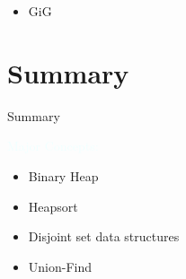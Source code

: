\documentclass{beamer}
\newcommand{\tblue}[1]{{\Large {\textcolor{azure}{#1}}}}
\begin{document}
\begin{frame}{}
    \begin{itemize}
        \item GiG
    \end{itemize}
\end{frame}

\section{Summary}

\begin{frame}{Summary}

\tblue{Major Concepts:}
\begin{itemize}
\item Binary Heap
\item Heapsort
\item Disjoint set data structures
\item Union-Find
\end{itemize}
\end{frame}
\end{document}
